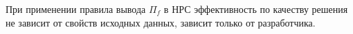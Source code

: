 При применении
правила вывода $\Pi_f$ в НРС эффективность по качеству решения
не зависит от свойств исходных данных, зависит только от разработчика.



%
%
%
%


